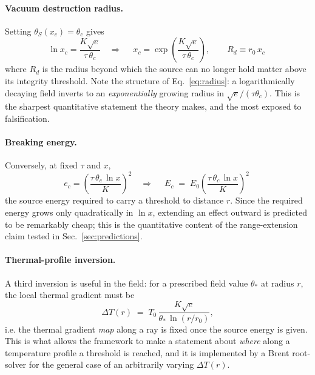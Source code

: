 \documentclass[11pt,a4paper]{article}
\newcommand{\thetaS}{\theta_{S}}
\newcommand{\tgrad}{\tau}
\begin{document}
\paragraph{Vacuum destruction radius.}
Setting $\thetaS(x_c)=\theta_c$ gives
\begin{equation}
  \ln x_c = \frac{K\sqrt{e}}{\tgrad\,\theta_c}
  \quad\Longrightarrow\quad
  \boxed{\; x_c = \exp\!\left(\frac{K\sqrt{e}}{\tgrad\,\theta_c}\right),
  \qquad R_d \equiv r_0\,x_c \;}
  \label{eq:radius}
\end{equation}
where $R_d$ is the radius beyond which the source can no longer hold matter
above its integrity threshold. Note the structure of Eq.~\eqref{eq:radius}:
a logarithmically decaying field inverts to an \emph{exponentially} growing
radius in $\sqrt{e}/(\tgrad\theta_c)$. This is the sharpest quantitative
statement the theory makes, and the most exposed to falsification.

\paragraph{Breaking energy.}
Conversely, at fixed $\tgrad$ and $x$,
\begin{equation}
  e_c = \left(\frac{\tgrad\,\theta_c\,\ln x}{K}\right)^{\!2}
  \quad\Longrightarrow\quad
  \boxed{\; E_c \;=\; E_0
    \left(\frac{\tgrad\,\theta_c\,\ln x}{K}\right)^{\!2} \;}
  \label{eq:energy}
\end{equation}
the source energy required to carry a threshold to distance $r$. Since the
required energy grows only quadratically in $\ln x$, extending an effect
outward is predicted to be remarkably cheap; this is the quantitative content
of the range-extension claim tested in Sec.~\ref{sec:predictions}.

\paragraph{Thermal-profile inversion.}
A third inversion is useful in the field: for a prescribed field value
$\theta_\ast$ at radius $r$, the local thermal gradient must be
\begin{equation}
  \Delta T(r) \;=\; T_0\,\frac{K\sqrt{e}}{\theta_\ast\,\ln(r/r_0)} ,
  \label{eq:thermalinv}
\end{equation}
i.e. the thermal gradient \emph{map} along a ray is fixed once the source
energy is given. This is what allows the framework to make a statement about
\emph{where} along a temperature profile a threshold is reached, and it is
implemented by a Brent root-solver for the general case of an
arbitrarily varying $\Delta T(r)$.
\end{document}

